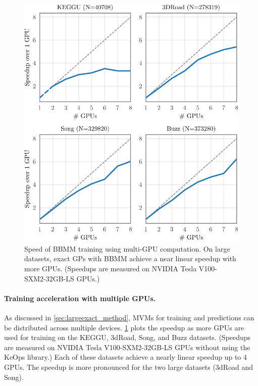 \begin{figure}[t!]
  \centering
  \includegraphics[width=0.70\linewidth]{figures/gpu_speedup.pdf}
  \caption[Speed of BBMM training using multi-GPU computation.]{
    Speed of BBMM training using multi-GPU computation.
    On large datasets, exact GPs with BBMM achieve a near linear speedup with more GPUs.
    (Speedups are measured on NVIDIA Tesla V100-SXM2-32GB-LS GPUs.)
  }
  \label{fig:gpu_speedup}
\end{figure}

\paragraph{Training acceleration with multiple GPUs.}
As discussed in \cref{sec:largeexact_method}, MVMs for training and predictions can be distributed across multiple devices.
\cref{fig:gpu_speedup} plots the speedup as more GPUs are used for training on the KEGGU, 3dRoad, Song, and Buzz datasets.
(Speedups are measured on NVIDIA Tesla V100-SXM2-32GB-LS GPUs without using the KeOps library.)
Each of these datasets achieve a nearly linear speedup up to 4 GPUs.
The speedup is more pronounced for the two large datasets (3dRoad and Song).

